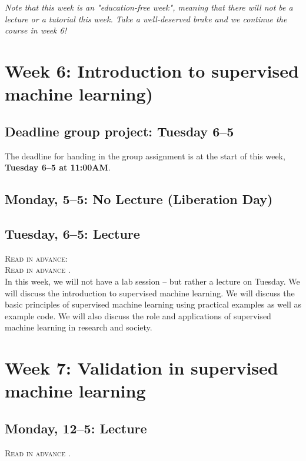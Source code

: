 \emph{Note that this week is an "education-free week", meaning that there will not be a lecture or a tutorial this week. Take a well-deserved brake and we continue the course in week 6!}

\section*{Week 6: Introduction to supervised machine learning)}

\subsection*{Deadline group project: Tuesday 6--5}

The deadline for handing in the group assignment is at the start of this week, \textbf{Tuesday 6--5 at 11:00AM}.

\subsection*{Monday, 5--5: No Lecture (Liberation Day)}

\subsection*{Tuesday, 6--5: Lecture}
\textsc{ Read in advance: \cite{vermeer_seeing_2019}}\\
\textsc{ Read in advance \cite{meppelink_reliable_2021}.}\\

In this week, we will not have a lab session -- but rather a lecture on Tuesday. We will discuss the introduction to supervised machine learning. We will discuss the basic principles of supervised machine learning using practical examples as well as example code. We will also discuss the role and applications of supervised machine learning in research and society.


\section*{Week 7: Validation in supervised machine learning}

\subsection*{Monday, 12--5: Lecture}
\textsc{ Read in advance \cite{birkenmaier_search_2023}.}\\

